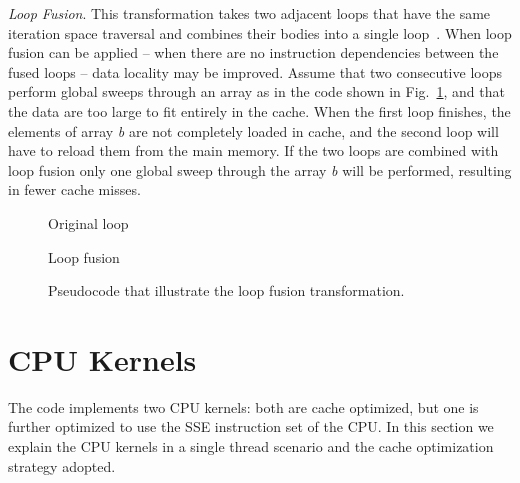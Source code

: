 \noindent \textit{Loop Fusion}. This transformation takes two adjacent loops that have the same iteration space traversal and combines their bodies into a single loop~\citep{Darte99onthe}.
When loop fusion can be applied -- when there are no instruction dependencies between the fused loops -- data locality may be improved. Assume that two consecutive loops perform global sweeps through an array as in the code shown in Fig.~\ref{algo:loop-fusion}, and that the data are too large to fit entirely in the cache. When the first loop finishes, the elements of array \textit{b} are not completely loaded in cache, and the second loop will have to reload them from the main memory. If the two loops are combined with loop fusion only one global sweep through the array \textit{b} will be performed, resulting in fewer cache misses. \\
\begin{figure}[h!]
\begin{minipage}[t]{6cm}
\null
\begin{algorithm}[H]
\caption{Original loop}
\SetAlgoLined
{}
\end{algorithm}
\end{minipage}%
\begin{minipage}[t]{6cm}
\null
\begin{algorithm}[H]
\caption{Loop fusion}
\SetAlgoLined
{}
\end{algorithm}
\end{minipage}
\caption{Pseudocode that illustrate the loop fusion transformation.} \label{algo:loop-fusion}
\end{figure}

\section{CPU Kernels}
The code implements two CPU kernels: both are  cache optimized, but one is further optimized to use the SSE instruction set of the CPU. In this section we explain the CPU kernels in a single thread scenario and the cache optimization strategy adopted.

